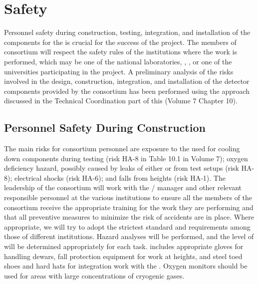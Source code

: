 \section{Safety}
\label{sec:fdsp-tpcelec-safety}

Personnel safety during construction, testing, integration,
and installation of the  components for the 
  is crucial for the success
of the project. The members of  consortium will
respect the safety rules of the institutions where the work is
performed, which may be one of the national laboratories, , ,
or one of the universities participating in the project. A
preliminary analysis of the risks involved in the design,
construction, integration, and installation of the detector
components provided by the  consortium has been
performed using the approach discussed in the Technical
Coordination part of this  (Volume 7 Chapter 10). 


\subsection{Personnel Safety During Construction}
\label{sec:fdsp-tpcelec-safety-personnel}

The main risks for consortium personnel are exposure to
the \lntwo used for cooling down components during testing (risk HA-8
in Table 10.1 in Volume 7);
oxygen deficiency hazard, possibly caused by leaks
of either \lntwo or  from test setups (risk HA-8);
electrical shocks (risk HA-6); and falls from heights (risk HA-1). The leadership of the
 consortium will work with the /
 manager and other relevant responsible personnel at the
various institutions to ensure all the members of the
consortium receive the appropriate training for the work they
are performing and that all preventive measures to minimize
the risk of accidents are in place. Where appropriate,
we will try to adopt the strictest standard and requirements among
those of different institutions. Hazard analyses will be performed,
and the level of  will be determined
appropriately for each task.  includes 
appropriate gloves for handling \lntwo dewars, fall
protection equipment for work at heights, and steel toed shoes and
hard hats for integration work with the . Oxygen
monitors should be used for areas with large concentrations of
cryogenic gases.

